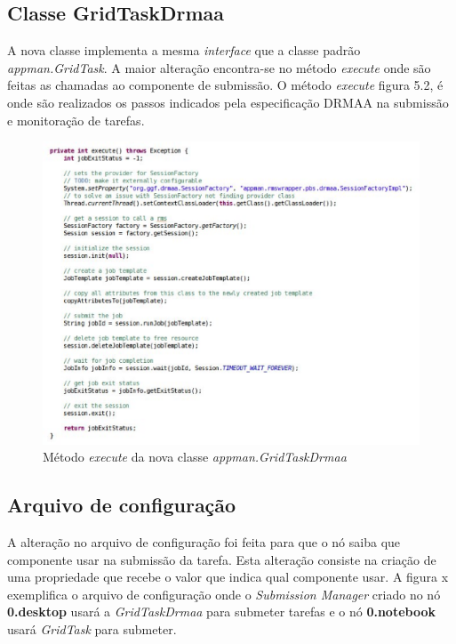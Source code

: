 \subsection{Classe GridTaskDrmaa}

A nova classe implementa a mesma \emph{interface} que a classe padrão \emph{appman.GridTask}. A maior alteração encontra-se no método \emph{execute} onde são feitas as chamadas ao componente de submissão. O método \emph{execute} figura 5.2, é onde são realizados os passos indicados pela especificação DRMAA na submissão e monitoração de tarefas.

\begin{figure}[htb]
\begin{center}
\includegraphics[scale=0.65]{./img/execute.eps}
\caption{Método \emph{execute} da nova classe \emph{appman.GridTaskDrmaa}}
\label{fig:UML_DRMAA}
\end{center}
\end{figure}

\subsection{Arquivo de configuração}

A alteração no arquivo de configuração foi feita para que o nó saiba que componente usar na submissão da tarefa. Esta alteração consiste na criação de uma propriedade que recebe o valor que indica qual componente usar. A figura x exemplifica o arquivo de configuração onde o \emph{Submission Manager} criado no nó \textbf{0.desktop} usará a \emph{GridTaskDrmaa} para submeter tarefas e o nó \textbf{0.notebook} usará \emph{GridTask} para submeter.

